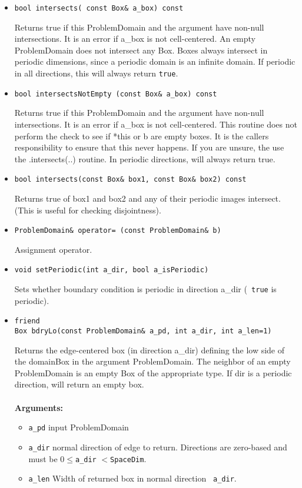 \begin{itemize}
\item
\begin{verbatim}
bool intersects( const Box& a_box) const
\end{verbatim}
Returns true if this ProblemDomain and the argument have non-null
intersections.  It is an error if a\_box is not cell-centered.  An
empty ProblemDomain does not intersect any Box.  Boxes always
intersect in periodic dimensions, since a periodic domain is an
infinite domain.  If periodic in all directions, this will always
return {\tt true}.


\item
\begin{verbatim}
bool intersectsNotEmpty (const Box& a_box) const
\end{verbatim}
Returns true if this ProblemDomain and the argument have non-null
intersections.  It is an error if a\_box is not cell-centered.
This routine does not perform the check to see if *this or b are
empty boxes.  It is the callers responsibility to ensure that
this never happens.  If you are unsure, the use the .intersects(..) 
routine.  In periodic directions, will always return true.

\item
\begin{verbatim}
bool intersects(const Box& box1, const Box& box2) const
\end{verbatim}
Returns true of box1 and box2 and any of their periodic images
intersect. (This is useful for checking disjointness).

\item
\begin{verbatim}
ProblemDomain& operator= (const ProblemDomain& b)
\end{verbatim}
Assignment operator.

\item
\begin{verbatim}
void setPeriodic(int a_dir, bool a_isPeriodic)
\end{verbatim}
Sets whether boundary condition is periodic in direction a\_dir ({\tt
true} is periodic).


\item
\begin{verbatim}
friend
Box bdryLo(const ProblemDomain& a_pd, int a_dir, int a_len=1)
\end{verbatim}
Returns the edge-centered box (in direction a\_dir) defining the low
side of the domainBox in the argument ProblemDomain.  The neighbor of
an empty ProblemDomain is an empty Box of the appropriate type.  If
dir is a periodic direction, will return an empty box. \\ 
\\
{\bf Arguments:}
\begin{itemize}
\item \verb/a_pd/ input ProblemDomain
\item \verb/a_dir/ normal direction of edge to return.  Directions are
zero-based and must be $0 \leq${\tt a\_dir} $<${\tt SpaceDim}.
\item \verb/a_len/ Width of returned box in normal direction {\tt
a\_dir}.
\end{itemize}



\end{itemize}

